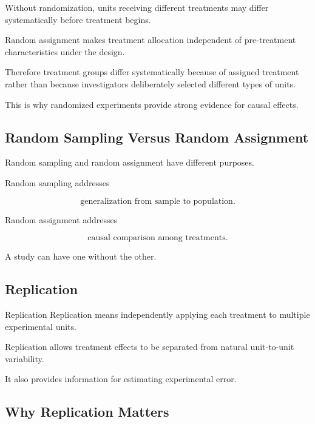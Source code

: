 Without randomization, units receiving different treatments may differ
systematically before treatment begins.

Random assignment makes treatment allocation independent of pre-treatment
characteristics under the design.

Therefore treatment groups differ systematically because of assigned
treatment rather than because investigators deliberately selected
different types of units.

This is why randomized experiments provide strong evidence for causal
effects.

\subsection{Random Sampling Versus Random Assignment}
\label{subsec:random-sampling-random-assignment-design}

Random sampling and random assignment have different purposes.

Random sampling addresses

\[
\boxed{
\text{generalization from sample to population}.
}
\]

Random assignment addresses

\[
\boxed{
\text{causal comparison among treatments}.
}
\]

A study can have one without the other.

\subsection{Replication}
\label{subsec:replication-design}

\begin{definitionbox}{Replication}
Replication means independently applying each treatment to multiple
experimental units.
\end{definitionbox}

Replication allows treatment effects to be separated from natural
unit-to-unit variability.

It also provides information for estimating experimental error.

\subsection{Why Replication Matters}
\label{subsec:why-replication-matters}

